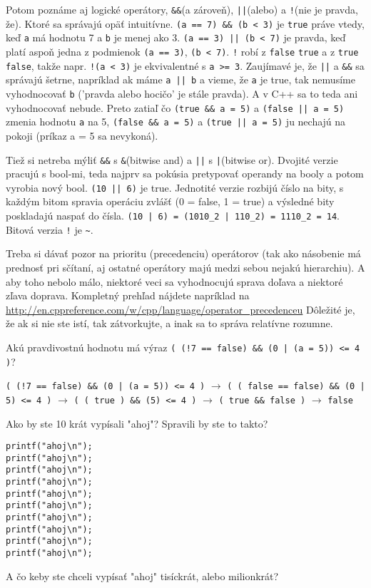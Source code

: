 Potom poznáme aj logické operátory, \verb!&&!(a zároveň), \verb!||!(alebo) a
\verb'!'(nie je pravda, že). Ktoré sa správajú opäť intuitívne.  
\verb!(a == 7) && (b < 3)! je \verb!true! práve vtedy, keď \verb!a! má hodnotu 7 a
\verb!b! je menej ako 3. \verb!(a == 3) || (b < 7)! je pravda, keď platí aspoň jedna
z podmienok \verb!(a == 3)!, \verb!(b < 7)!. \verb'!' robí z 
\verb!false! \verb!true! a z \verb!true! \verb!false!, takže napr. \verb'!(a < 3)' je
ekvivalentné s \verb'a >= 3'.  Zaujímavé je, že \verb!||! a \verb!&&! sa
správajú šetrne, napríklad ak máme \verb!a || b! a vieme, že \verb!a! je true, tak
nemusíme vyhodnocovať \verb!b! ('pravda alebo hocičo' je stále pravda). A v C++ sa
to teda ani vyhodnocovať nebude.  Preto zatiaľ čo \verb!(true && a = 5)! a
\verb!(false || a = 5)!  zmenia hodnotu \verb!a! na 5, \verb!(false && a = 5)! a
\verb!(true || a = 5)! ju nechajú na pokoji (príkaz a = 5 sa nevykoná).

Tiež si netreba mýliť \verb!&&! s \verb!&!(bitwise and) a \verb!||! s
\verb!|!(bitwise or). Dvojité verzie pracujú s bool-mi, teda najprv sa pokúsia
pretypovať operandy na booly a potom vyrobia nový bool. \verb!(10 || 6)! je true.
Jednotité verzie rozbijú číslo na bity, s každým bitom spravia operáciu zvlášť
(0 = false, 1 = true) a výsledné bity poskladajú naspať do čísla. 
\verb!(10 | 6) = (1010_2 | 110_2) = 1110_2 = 14!.  Bitová verzia \verb'!' je \verb'~'.

Treba si dávať pozor na prioritu (precedenciu) operátorov (tak ako násobenie má
prednosť pri sčítaní, aj ostatné operátory majú medzi sebou nejakú hierarchiu).
A aby toho nebolo málo, niektoré veci sa vyhodnocujú sprava doľava a niektoré
zľava doprava. Kompletný prehľad nájdete napríklad na
\url{http://en.cppreference.com/w/cpp/language/operator\_precedenceu} Dôležité
je, že ak si nie ste istí, tak zátvorkujte, a inak sa to správa relatívne
rozumne.

\cvicenie Akú pravdivostnú hodnotu má výraz 
\verb'( (!7 == false) && (0 | (a = 5)) <= 4 )'?

\riesenie \verb'( (!7 == false) && (0 | (a = 5)) <= 4 )' $\rightarrow$
\verb'( ( false == false) && (0 | 5) <= 4 )' $\rightarrow$
\verb'( ( true ) && (5) <= 4 )' $\rightarrow$ \verb'( true && false )' $\rightarrow$ \verb'false'


Ako by ste 10 krát vypísali "ahoj"? Spravili by ste to takto?
\begin{lstlisting}
printf("ahoj\n");
printf("ahoj\n");
printf("ahoj\n");
printf("ahoj\n");
printf("ahoj\n");
printf("ahoj\n");
printf("ahoj\n");
printf("ahoj\n");
printf("ahoj\n");
printf("ahoj\n");
\end{lstlisting}
A čo keby ste chceli vypísať "ahoj" tisíckrát, alebo milionkrát?

